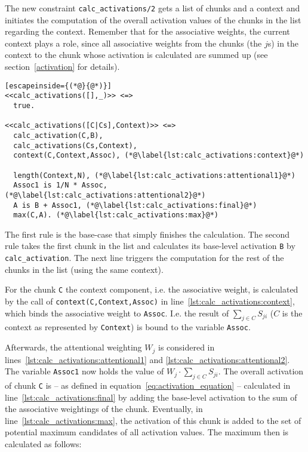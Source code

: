 The new constraint \lstinline|calc_activations/2| gets a list of chunks and a context and initiates the computation of the overall activation values of the chunks in the list regarding the context. Remember that for the associative weights, the current context plays a role, since all associative weights from the chunks (the $j$s) in the context to the chunk whose activation is calculated are summed up (see section~\ref{activation} for details).

\begin{lstlisting}[escapeinside={(*@}{@*)}]
<<calc_activations([],_)>> <=>
  true.
  
<<calc_activations([C|Cs],Context)>> <=> 
  calc_activation(C,B), 
  calc_activations(Cs,Context), 
  context(C,Context,Assoc), (*@\label{lst:calc_activations:context}@*)
  
  length(Context,N), (*@\label{lst:calc_activations:attentional1}@*)
  Assoc1 is 1/N * Assoc, (*@\label{lst:calc_activations:attentional2}@*)
  A is B + Assoc1, (*@\label{lst:calc_activations:final}@*)
  max(C,A). (*@\label{lst:calc_activations:max}@*)
\end{lstlisting}

The first rule is the base-case that simply finishes the calculation. The second rule takes the first chunk in the list and calculates its base-level activation \lstinline|B| by \lstinline|calc_activation|. The next line triggers the computation for the rest of the chunks in the list (using the same context).

For the chunk \lstinline|C| the context component, i.e. the associative weight, is calculated by the call of \lstinline|context(C,Context,Assoc)| in line~\ref{lst:calc_activations:context}, which binds the associative weight to \lstinline|Assoc|. I.e. the result of $\sum_{j \in C}{S_{ji}}$ ($C$ is the context as represented by \lstinline|Context|) is bound to the variable \lstinline|Assoc|.

Afterwards, the attentional weighting $W_j$ is considered in lines~\ref{lst:calc_activations:attentional1} and \ref{lst:calc_activations:attentional2}. The variable \lstinline|Assoc1| now holds the value of $W_j \cdot \sum_{j \in C}{S_{ji}}$. The overall activation of chunk \lstinline|C| is -- as defined in equation~\eqref{eq:activation_equation} -- calculated in line~\ref{lst:calc_activations:final} by adding the base-level activation to the sum of the associative weightings of the chunk. Eventually, in line~\ref{lst:calc_activations:max}, the activation of this chunk is added to the set of potential maximum candidates of all activation values. The maximum then is calculated as follows:

